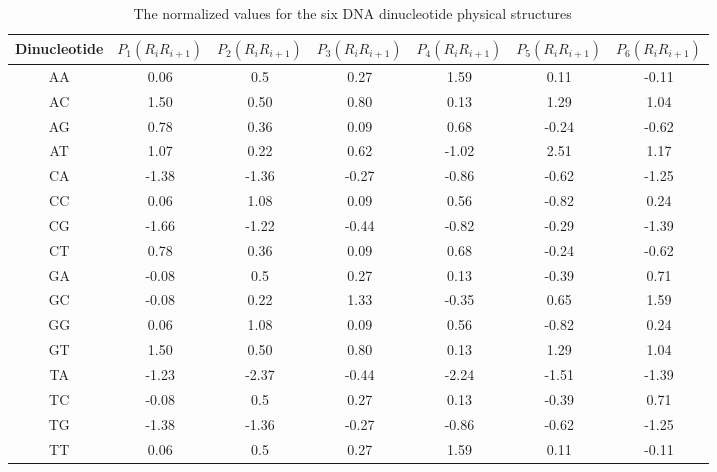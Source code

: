 \begin{table}[ht]

    \caption{The normalized values for the six DNA dinucleotide physical structures
    ~\cite{Chen2013IRSpot-PseDNC:Composition}}
    \label{tab:normalized_values}
    
    \centering
    \begin{tabular}{ccccccc}

        \toprule
        \textbf{Dinucleotide} & $P_{1}(R_{i}R_{i+1})$ & $P_{2}(R_{i}R_{i+1})$ & $P_{3}(R_{i}R_{i+1})$ & $P_{4}(R_{i}R_{i+1})$ & $P_{5}(R_{i}R_{i+1})$ & $P_{6}(R_{i}R_{i+1})$\\\midrule
        
        AA & 0.06  &	0.5 	& 0.27 	& 1.59 	& 0.11 	& -0.11 \\\midrule
        AC & 1.50  &	0.50 	& 0.80 	& 0.13 	& 1.29 	& 1.04 \\\midrule
        AG & 0.78  &	0.36 	& 0.09 	& 0.68 	& -0.24 & -0.62 \\\midrule
        AT & 1.07  &	0.22 	& 0.62 	& -1.02 & 2.51 	& 1.17 \\\midrule
        CA & -1.38 & 	-1.36 	& -0.27 & -0.86 & -0.62 & -1.25 \\\midrule
        CC & 0.06  &	1.08 	& 0.09 	& 0.56 	& -0.82 & 0.24 \\\midrule
        CG & -1.66 & 	-1.22 	& -0.44 & -0.82 & -0.29 & -1.39 \\\midrule
        CT & 0.78  &	0.36 	& 0.09 	& 0.68 	& -0.24 & -0.62 \\\midrule
        GA & -0.08 & 	0.5 	& 0.27 	& 0.13 	& -0.39 & 0.71 \\\midrule
        GC & -0.08 & 	0.22 	& 1.33 	& -0.35 & 0.65 	& 1.59 \\\midrule
        GG & 0.06  &	1.08 	& 0.09 	& 0.56 	& -0.82 & 0.24 \\\midrule
        GT & 1.50  &	0.50 	& 0.80 	& 0.13 	& 1.29 	& 1.04 \\\midrule
        TA & -1.23 & 	-2.37 	& -0.44 & -2.24 & -1.51 & -1.39 \\\midrule
        TC & -0.08 & 	0.5 	& 0.27 	& 0.13 	& -0.39 & 0.71 \\\midrule
        TG & -1.38 & 	-1.36 	& -0.27 & -0.86 & -0.62 & -1.25 \\\midrule
        TT & 0.06  &	0.5 	& 0.27 	& 1.59 	& 0.11 	& -0.11 \\

        \bottomrule
    \end{tabular}
\end{table}

